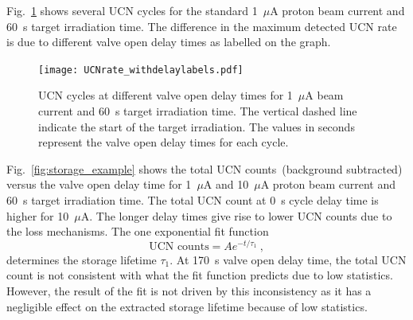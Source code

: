 Fig.~\ref{fig:storage_all} shows several UCN cycles for the standard
1~$\mu$A proton beam current and 60~s target irradiation time. The
difference in the maximum detected UCN rate is due to different valve
open delay times as labelled on the graph.
\begin{figure}[h!]
  \centering
  \texttt{[image: UCNrate\_withdelaylabels.pdf]}
  \caption[UCN rate at different value open delay times at 1~$\mu$A
  beam current and 60~s irradiation time ]{UCN cycles at different
    valve open delay times for 1~$\mu$A beam current and 60~s target
    irradiation time. The vertical dashed line indicate the start of
    the target irradiation. The values in seconds represent the valve
    open delay times for each cycle.}
  \label{fig:storage_all}
\end{figure}
Fig.~\ref{fig:storage_example} shows the total UCN counts~(background
subtracted) versus the valve open delay time for 1~$\mu$A and
10~$\mu$A proton beam current and 60~s target irradiation time. The
total UCN count at 0~s cycle delay time is higher for 10~$\mu$A. The
longer delay times give rise to lower UCN counts due to the loss
mechanisms. The one exponential fit function
\begin{equation}
\text{UCN counts} = A e^{-t/\tau_1}~,
\end{equation}
determines the storage lifetime $\tau_1$. At 170~s valve open delay
time, the total UCN count is not consistent with what the fit function
predicts due to low statistics. However, the result of the fit is not
driven by this inconsistency as it has a negligible effect on the
extracted storage lifetime because of low statistics.

